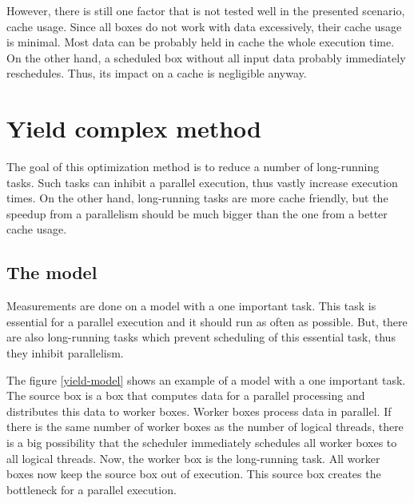 However, there is still one factor that is not tested well in the presented scenario, cache usage. Since all boxes do not work with data excessively, their cache usage is minimal. Most data can be probably held in cache the whole execution time. On the other hand, a scheduled box without all input data probably immediately reschedules. Thus, its impact on a cache is negligible anyway.

\section{Yield complex method}
The goal of this optimization method is to reduce a number of long-running tasks. Such tasks can inhibit a parallel execution, thus vastly increase execution times. On the other hand, long-running tasks are more cache friendly, but the speedup from a parallelism should be much bigger than the one from a better cache usage.

\subsection{The model}
Measurements are done on a model with a one important task. This task is essential for a parallel execution and it should run as often as possible. But, there are also long-running tasks which prevent scheduling of this essential task, thus they inhibit parallelism.

The figure \ref{yield-model} shows an example of a model with a one important task. The source box is a box that computes data for a parallel processing and distributes this data to worker boxes. Worker boxes process data in parallel. If there is the same number of worker boxes as the number of logical threads, there is a big possibility that the scheduler immediately schedules all worker boxes to all logical threads. Now, the worker box is the long-running task. All worker boxes now keep the source box out of execution. This source box creates the bottleneck for a parallel execution.

